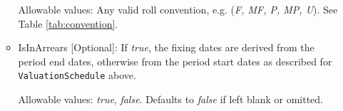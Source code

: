 \begin{itemize}
\begin{itemize}
  Allowable values: Any valid roll convention, e.g. (\emph{F, MF, P, MP, U}). See Table \ref{tab:convention}.

\item IsInArrears [Optional]: If \emph{true}, the fixing dates are derived from the period end dates,
  otherwise from the period start dates as described for \lstinline!ValuationSchedule! above.

  Allowable values: \emph{true}, \emph{false}. Defaults to \emph{false} if left blank or omitted. 

\end{itemize}

\end{itemize}
